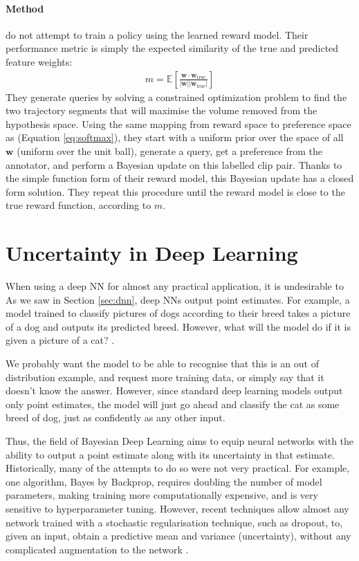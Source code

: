 \documentclass[11pt, a4paper, bibliography=totoc]{report}
\newcommand{\w}{\mathbf{w}}
\begin{document}
\subsubsection{Method}
\cite{Byk2017} do not attempt to train a policy using the learned reward model. Their performance metric is simply the expected similarity of the true and predicted feature weights:
\begin{align*}
m = \mathbb{E}\left[  \frac{\w \cdot \w_\text{true}}{\vert \w \vert \vert \w_\text{true} \vert}  \right]
\end{align*}
They generate queries by solving a constrained optimization problem to find the two trajectory segments that will maximise the volume removed from the hypothesis space. Using the same mapping from reward space to preference space as \cite{Christiano2017} (Equation \ref{eq:softmax}), they start with a uniform prior over the space of all $ \w $ (uniform over the unit ball), generate a query, get a preference from the annotator, and perform a Bayesian update on this labelled clip pair. Thanks to the simple function form of their reward model, this Bayesian update has a closed form solution. They repeat this procedure until the reward model is close to the true reward function, according to $ m $.

\chapter{Uncertainty in Deep Learning}
When using a deep NN for almost any practical application, it is undesirable to 
As we saw in Section \ref{sec:dnn}, deep NNs output point estimates. %
For example, a model trained to classify pictures of dogs according to their breed takes a picture of a dog and outputs its predicted breed. However, what will the model do if it is given a picture of a cat? \cite{Gal2017a}.

We probably want the model to be able to recognise that this is an out of distribution example, and request more training data, or simply say that it doesn't know the answer. However, since standard deep learning models output only point estimates, the model will just go ahead and classify the cat as some breed of dog, just as confidently as any other input.

Thus, the field of Bayesian Deep Learning aims to equip neural networks with the ability to output a point estimate along with its uncertainty in that estimate. Historically, many of the attempts to do so were not very practical. For example, one algorithm, Bayes by Backprop, requires doubling the number of model parameters, making training more computationally expensive, and is very sensitive to hyperparameter tuning. However, recent techniques allow almost any network trained with a stochastic regularisation technique, such as dropout, to, given an input, obtain a predictive mean and variance (uncertainty), without any complicated augmentation to the network \cite[p.~15]{Gal2017a}.
\end{document}
